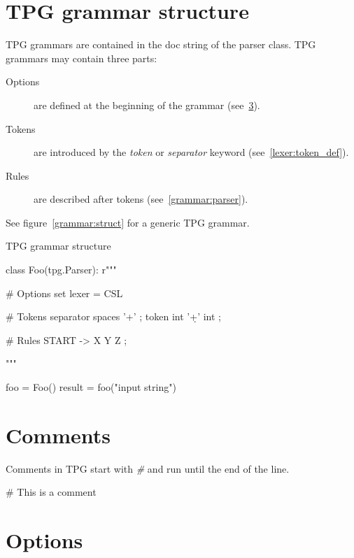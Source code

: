 \section{TPG grammar structure}

TPG grammars are contained in the doc string of the parser class.
TPG grammars may contain three parts:

\begin{description}
    \item [Options]
        are defined at the beginning of the grammar (see~\ref{grammar:options}).
    \item [Tokens]
        are introduced by the \emph{token} or \emph{separator} keyword (see~\ref{lexer:token_def}).
    \item [Rules]
        are described after tokens (see~\ref{grammar:parser}).
\end{description}

See figure~\ref{grammar:struct} for a generic TPG grammar.

\begin{code}
\caption{TPG grammar structure}                             \label{grammar:struct}
\begin{verbatimtab}[4]
class Foo(tpg.Parser):
    r"""

        # Options
        set lexer = CSL

        # Tokens
        separator spaces    '\s+'       ;
        token int           '\d+'   int ;

        # Rules
        START -> X Y Z ;

    """

foo = Foo()
result = foo("input string")
\end{verbatimtab}
\end{code}

\section{Comments}

Comments in TPG start with \emph{\#} and run until the end of the line.

\begin{verbatimtab}[4]
    # This is a comment
\end{verbatimtab}

\section{Options}                                           \label{grammar:options}

